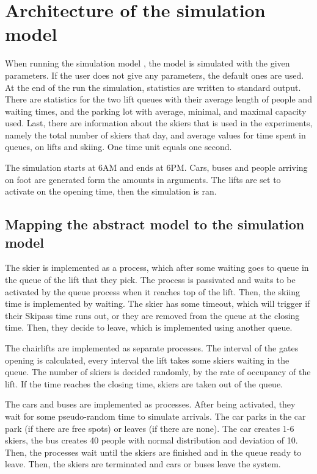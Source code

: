 \documentclass[11pt,a4paper]{article}
\begin{document}
\section{Architecture of the simulation model}
When running the simulation model \cite[slide 44]{slides}, the model is simulated with the given parameters. If the user does not give any parameters, the default ones are used. At the end of the run the simulation, statistics are written to standard output. There are statistics for the two lift queues with their average length of people and waiting times, and the parking lot with average, minimal, and maximal capacity used. Last, there are information about the skiers that is used in the experiments, namely the total number of skiers that day, and average values for time spent in queues, on lifts and skiing. One time unit equals one second.

The simulation starts at 6AM and ends at 6PM. Cars, buses and people arriving on foot are generated form the amounts in arguments. The lifts are set to activate on the opening time, then the simulation is ran. 
\subsection{Mapping the abstract model to the simulation model}
The skier is implemented as a process, which after some waiting goes to queue in the queue of the lift that they pick. The process is passivated and waits to be activated by the queue process when it reaches top of the lift. Then, the skiing time is implemented by waiting. The skier has some timeout, which will trigger if their Skipass time runs out, or they are removed from the queue at the closing time. Then, they decide to leave, which is implemented using another queue.

The chairlifts are implemented as separate processes. The interval of the gates opening is calculated, every interval the lift takes some skiers waiting in the queue. The number of skiers is decided randomly, by the rate of occupancy of the lift. If the time reaches the closing time, skiers are taken out of the queue.

The cars and buses are implemented as processes. After being activated, they wait for some pseudo-random time to simulate arrivals. The car parks in the car park (if there are free spots) or leaves (if there are none). The car creates 1-6 skiers, the bus creates 40 people with normal distribution and deviation of 10. Then, the processes wait until the skiers are finished and in the queue ready to leave. Then, the skiers are terminated and cars or buses leave the system.
\end{document}
